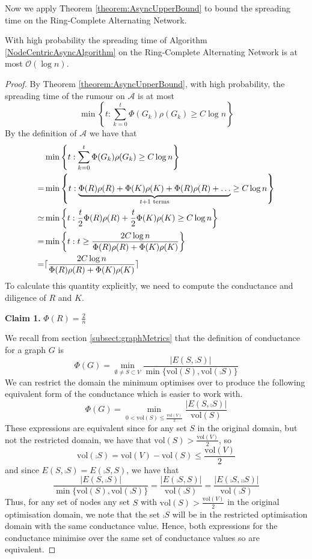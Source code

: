 
Now we apply Theorem \ref{theorem:AsyncUpperBound} to bound the spreading time on the Ring-Complete Alternating Network.

\begin{theorem}\label{theorem:ringCompleteAsyncBound}
	With high probability the spreading time of Algorithm \ref{NodeCentricAsyncAlgorithm} on the Ring-Complete Alternating Network is at most $\mathcal{O}(\log n)$. 
\end{theorem}

\begin{proof}
By Theorem \ref{theorem:AsyncUpperBound}, with high probability, the spreading time of the rumour on $\mathcal{A}$ is at most
$$
	\min \left\{t : \sum_{k=0}^t \Phi(G_k)\rho(G_k) \geq C \log n \right\} 
$$
By the definition of $\mathcal{A}$ we have that 
\begin{align*}
	&\min \left\{t : \sum_{k=0}^t \Phi(G_k)\rho(G_k) \geq C \log n \right\} \\
	= &\min \left\{t : \underbrace{\Phi(R)\rho(R) + \Phi(K)\rho(K) + \Phi(R)\rho(R) + \dots}_{t + 1 \text{ terms}} \geq C \log n \right\} \\
	\simeq &\min \left\{t : \frac{t}{2}\Phi(R)\rho(R) + \frac{t}{2}\Phi(K)\rho(K) \geq C \log n \right\} \\
	= &\min \left\{t : t \geq \frac{2C \log n}{\Phi(R)\rho(R) + \Phi(K)\rho(K)} \right\} \\
	= &\lceil\frac{2C \log n}{\Phi(R)\rho(R) + \Phi(K)\rho(K)}\rceil
\end{align*} %
To calculate this quantity explicitly, we need to compute the conductance and diligence of $R$ and $K$. 

\textbf{Claim 1.} $\Phi(R)=\frac{2}{n}$

We recall from section \ref{subsect:graphMetrics} that the definition of conductance for a graph $G$ is 
$$
	\Phi(G) 
	= \min_{\emptyset \neq S \subset V} \frac{|E(S, \comp{S})|}{\min\{\text{vol}(S), \text{vol}(\comp{S})\}} 
$$
We can restrict the domain the minimum optimises over to produce the following equivalent form of the conductance which is easier to work with.
$$
	\Phi(G) 
	= \min_{0 < \text{vol}(S) \leq \frac{\text{vol}(V)}{2}} \frac{|E(S, \comp{S})|}{\text{vol}(S)} 
$$
These expressions are equivalent since for any set $S$ in the original domain, but not the restricted domain, we have that $\text{vol}(S) > \frac{\text{vol}(V)}{2}$, so
$$
	\text{vol}(\comp{S}) 
	= \text{vol}(V) - \text{vol}(S) 
	\leq \frac{\text{vol}(V)}{2}
$$
and since $E(S, \comp{S}) = E(\comp{S}, S)$, we have that
$$
	\frac{|E(S, \comp{S})|}{\min\{\text{vol}(S), \text{vol}(\comp{S})\}} = \frac{|E(\comp{S}, S)|}{\text{vol}(\comp{S})} 
	= 
	\frac{|E(\comp{S}, \comp{\comp{S}})|}{\text{vol}(\comp{S})} 
$$
Thus, for any set of nodes any set $S$ with $\text{vol}(S) > \frac{\text{vol}(V)}{2}$ in the original optimisation domain, we note that the set $\comp{S}$ will be in the restricted optimisation  domain with the same conductance value. Hence, both expressions for the conductance minimise over the same set of conductance values so are equivalent.


\end{proof}
